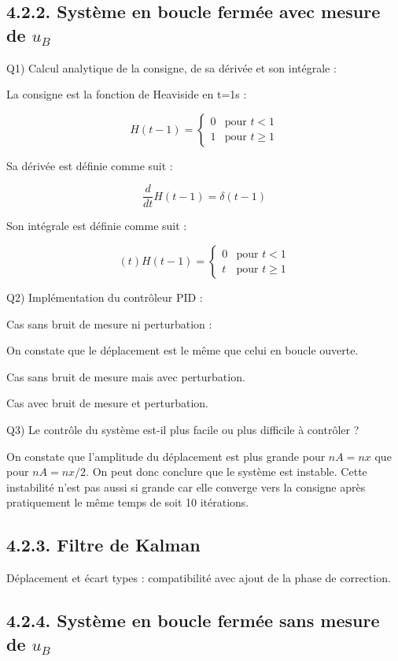 \documentclass{rapportECL}
\begin{document}
\subsection{4.2.2. Syst\`eme en boucle ferm\'ee avec mesure de $u_B$}

Q1) Calcul analytique de la consigne, de sa d\'eriv\'ee et son int\'egrale :

La consigne est la fonction de Heaviside en t=1s :

\[ H(t - 1) = \begin{cases} 0 & \text{pour } t < 1 \\ 1 & \text{pour } t \ge 1 \end{cases} \]

Sa d\'eriv\'ee est d\'efinie comme suit :

\[ \frac{d}{dt} H(t - 1) = \delta(t - 1) \]

Son int\'egrale est d\'efinie comme suit :

\[ (t)H(t - 1) = \begin{cases} 0 & \text{pour } t < 1 \\ t & \text{pour } t \ge 1 \end{cases} \]

Q2) Impl\'ementation du contr\^oleur PID :

Cas sans bruit de mesure ni perturbation :

On constate que le d\'eplacement est le m\^eme que celui en boucle ouverte.

Cas sans bruit de mesure mais avec perturbation.

Cas avec bruit de mesure et perturbation.

Q3) Le contr\^ole du syst\`eme est-il plus facile ou plus difficile \`a contr\^oler ?

On constate que l'amplitude du d\'eplacement est plus grande pour $nA=nx$ que pour $nA=nx/2$. On peut donc conclure que le syst\`eme est instable. Cette instabilit\'e n'est pas aussi si grande car elle converge vers la consigne apr\`es pratiquement le m\^eme temps de soit 10 it\'erations.

\subsection{4.2.3. Filtre de Kalman}

D\'eplacement et \'ecart types : compatibilit\'e avec ajout de la phase de correction.

\subsection{4.2.4. Syst\`eme en boucle ferm\'ee sans mesure de $u_B$}
\end{document}
